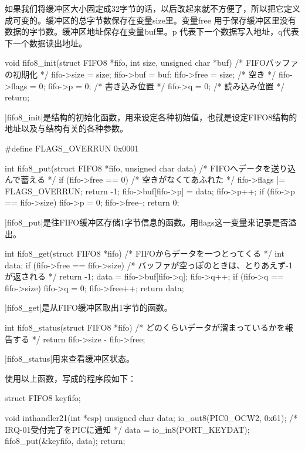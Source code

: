 如果我们将缓冲区大小固定成32字节的话，以后改起来就不方便了，所以把它定义成可变的。缓冲区的总字节数保存在变量size里。变量free 用于保存缓冲区里没有数据的字节数。缓冲区地址保存在变量buf里。p 代表下一个数据写入地址，q代表下一个数据读出地址。
\begin{code}
void fifo8_init(struct FIFO8 *fifo, int size, unsigned char *buf)
/* FIFOバッファの初期化 */
{
	fifo->size = size;
	fifo->buf = buf;
	fifo->free = size; /* 空き */
	fifo->flags = 0;
	fifo->p = 0; /* 書き込み位置 */
	fifo->q = 0; /* 読み込み位置 */
	return;
}
\end{code}

|fifo8_init|是结构的初始化函数，用来设定各种初始值，也就是设定FIFO8结构的地址以及与结构有关的各种参数。

\begin{code}
#define FLAGS_OVERRUN		0x0001

int fifo8_put(struct FIFO8 *fifo, unsigned char data)
/* FIFOへデータを送り込んで蓄える */
{
	if (fifo->free == 0) {
		/* 空きがなくてあふれた */
		fifo->flags |= FLAGS_OVERRUN;
		return -1;
	}
	fifo->buf[fifo->p] = data;
	fifo->p++;
	if (fifo->p == fifo->size) {
		fifo->p = 0;
	}
	fifo->free--;
	return 0;
}
\end{code}

|fifo8_put|是往FIFO缓冲区存储1字节信息的函数。用flags这一变量来记录是否溢出。

\begin{code}
int fifo8_get(struct FIFO8 *fifo)
/* FIFOからデータを一つとってくる */
{
	int data;
	if (fifo->free == fifo->size) {
		/* バッファが空っぽのときは、とりあえず-1が返される */
		return -1;
	}
	data = fifo->buf[fifo->q];
	fifo->q++;
	if (fifo->q == fifo->size) {
		fifo->q = 0;
	}
	fifo->free++;
	return data;
}
\end{code}

|fifo8_get|是从FIFO缓冲区取出1字节的函数。
\begin{code}
int fifo8_status(struct FIFO8 *fifo)
/* どのくらいデータが溜まっているかを報告する */
{
	return fifo->size - fifo->free;
}
\end{code}

|fifo8_status|用来查看缓冲区状态。

使用以上函数，写成的程序段如下：
\begin{code}
struct FIFO8 keyfifo;

void inthandler21(int *esp)
{
	unsigned char data;
	io_out8(PIC0_OCW2, 0x61);	/* IRQ-01受付完了をPICに通知 */
	data = io_in8(PORT_KEYDAT);
	fifo8_put(&keyfifo, data);
	return;
}
\end{code}

